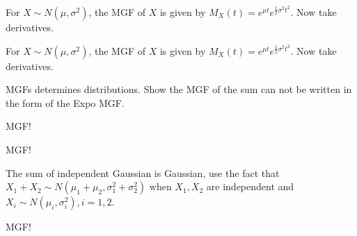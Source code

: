 \begin{Hint}{1.19}
			For $X \sim N(\mu, \sigma^2)$, the MGF of $X$ is given by $M_X(t) = e^{\mu t} e^{\frac{1}{2} \sigma^2 t^2}$. Now take derivatives.
		
\end{Hint}
\begin{Hint}{1.20}
			For $X \sim N(\mu, \sigma^2)$, the MGF of $X$ is given by $M_X(t) = e^{\mu t} e^{\frac{1}{2} \sigma^2 t^2}$. Now take derivatives.
		
\end{Hint}
\begin{Hint}{1.21}
		MGFs determines distributions. Show the MGF of the sum can not be written in the form of the Expo MGF.
	
\end{Hint}
\begin{Hint}{1.22}
		MGF!
	
\end{Hint}
\begin{Hint}{1.23}
		MGF!
	
\end{Hint}
\begin{Hint}{1.24}
		The sum of independent Gaussian is Gaussian, use the fact that $X_1+X_2\sim N(\mu_1+\mu_2, \sigma_1^2+\sigma_2^2)$ when $X_1,X_2$ are independent and $X_i\sim N(\mu_i, \sigma_i^2), i=1,2$.
	
\end{Hint}
\begin{Hint}{1.28}
		MGF!
	
\end{Hint}
